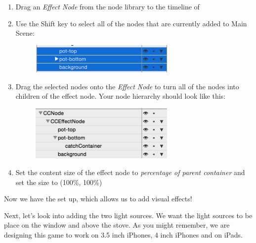 \begin{leftbar}
\begin{enumerate}
  \item Drag an \textit{Effect Node} from the node library to the timeline of
  \item Use the {Shift} key to select all of the nodes that are currently added
  to Main Scene: \begin{figure}[H]
    \centering
    \includegraphics[width=200pt]{images/Chapter9/shift_select.png}
    \end{figure}
  \item Drag the selected nodes onto the \textit{Effect Node} to turn all of the nodes into children of the effect node. Your node
  hierarchy should look like this:
  \begin{figure}[H]
    \centering
    \includegraphics[width=200pt]{images/Chapter9/node_hierarchy_effect.png}
  \end{figure}
  \item Set the content size of the effect node to \textit{percentage of parent
  container} and set the size to (100\%, 100\%)
\end{enumerate}
\end{leftbar}

Now we have the  set up, which allows us to add visual
effects!

Next, let's look into adding the two light sources. We want the light sources to
be place on the window and above the stove. As you might remember, we are designing this game to
work on 3.5 inch iPhones, 4 inch iPhones and on iPads. 

